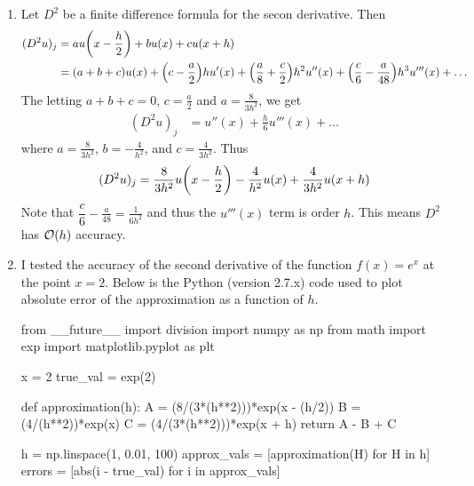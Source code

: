 \documentclass{article} %
\theoremstyle{plain}
\numberwithin{equation}{section} %
\numberwithin{figure}{section} %
\numberwithin{table}{section} %
\begin{document}
\begin{enumerate}[\ \ (a)]
    \item
        Let $D^2$ be a finite difference formula for the secon derivative.  Then
        \begin{align*}
            (D^2u)_j &= au\qty(x - \frac{h}{2}) + bu\qty(x) + cu\qty(x + h) \\
            &= (a + b + c)u(x) + \qty(c - \frac{a}{2})hu'(x) + \qty(\frac{a}{8} + \frac{c}{2})h^2 u''(x) + \qty(\frac{c}{6} - \frac{a}{48})h^3u'''(x) + \dots
        \end{align*}
        The letting $a + b + c = 0$, $c = \frac{a}{2}$ and $a = \frac{8}{3h^2}$, we get
        \begin{align*}
            (D^2u)_j &= u''(x) + \frac{h}{6}u'''(x) + \dots
        \end{align*}
        where $a = \frac{8}{3h^2}$, $b = -\frac{4}{h^2}$, and $c = \frac{4}{3h^2}$.  Thus
        \begin{align*}
            (D^2 u)_j = \frac{8}{3h^2}u\qty(x - \frac{h}{2}) - \frac{4}{h^2}u(x) + \frac{4}{3h^2}u(x + h)
        \end{align*}
        Note that $\dfrac{c}{6} - \frac{a}{48} = \frac{1}{6h^2}$ and thus the $u'''(x)$ term is order $h$.  This means $D^2$ has $\order{h}$ accuracy.
    \item
        I tested the accuracy of the second derivative of the function $f(x) = e^x$ at the point $x = 2$.  Below is the Python (version 2.7.x) code used to plot absolute error of the approximation as a function of $h$.
        \begin{code}
from __future__ import division
import numpy as np
from math import exp
import matplotlib.pyplot as plt

x = 2
true_val = exp(2)

def approximation(h):
    A = (8/(3*(h**2)))*exp(x - (h/2))
    B = (4/(h**2))*exp(x)
    C = (4/(3*(h**2)))*exp(x + h)
    return A - B + C

h = np.linspace(1, 0.01, 100)
approx_vals = [approximation(H) for H in h]
errors = [abs(i - true_val) for i in approx_vals]


\end{code}
\end{enumerate}
\end{document}

